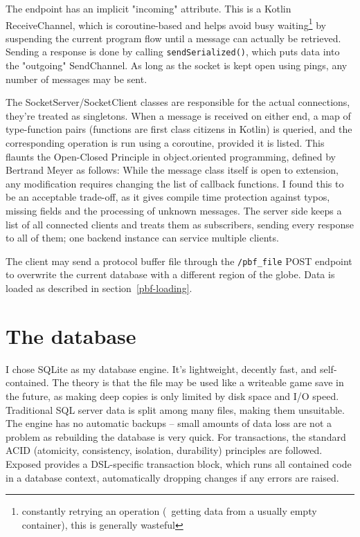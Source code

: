 The endpoint has an implicit "incoming" attribute. This is a Kotlin ReceiveChannel, which is coroutine-based and helps avoid busy waiting\footnote{constantly retrying an operation (\eg~getting data from a usually empty container), this is generally wasteful} by suspending the current program flow until a message can actually be retrieved. Sending a response is done by calling \verb|sendSerialized()|, which puts data into the "outgoing" SendChannel. As long as the socket is kept open using pings, any number of messages may be sent.


The SocketServer/SocketClient classes are responsible for the actual connections, they're treated as singletons. When a message is received on either end, a map of type-function pairs (functions are first class citizens in Kotlin) is queried, and the corresponding operation is run using a coroutine, provided it is listed. This flaunts the Open-Closed Principle in object.oriented programming, defined by Bertrand Meyer\cite{OOSC-OCP} as follows:  While the message class itself is open to extension, any modification requires changing the list of callback functions. I found this to be an acceptable trade-off, as it gives compile time protection against typos, missing fields and the processing of unknown messages.
The server side keeps a list of all connected clients and treats them as subscribers, sending every response to all of them; one backend instance can service multiple clients.

\label{file-upload}
The client may send a protocol buffer file through the \verb|/pbf_file| POST endpoint to overwrite the current database with a different region of the globe. Data is loaded as described in section~\ref{pbf-loading}.

\section{The database}

I chose SQLite as my database engine. It's lightweight, decently fast, and self-contained. The theory is that the file may be used like a writeable game save in the future, as making deep copies is only limited by disk space and I/O speed. Traditional SQL server data is split among many files, making them unsuitable. The engine has no automatic backups -- small amounts of data loss are not a problem as rebuilding the database is very quick. For transactions, the standard ACID (atomicity, consistency, isolation, durability) principles are followed. Exposed provides a DSL-specific transaction block, which runs all contained code in a database context, automatically dropping changes if any errors are raised.

